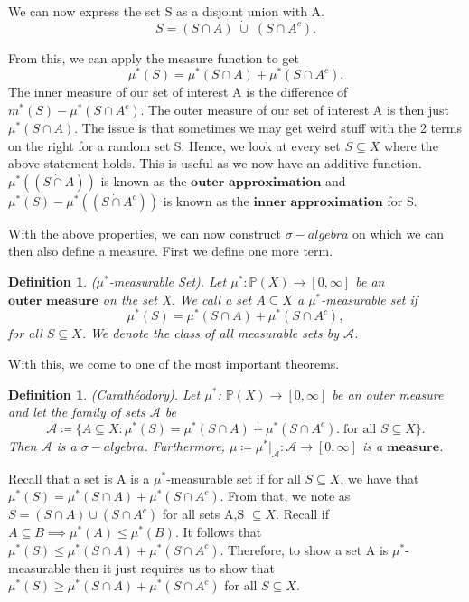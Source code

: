 \documentclass[twoside]{article}
\newtheorem{definition}[theorem]{Definition}
\newcommand{\sa}{\sigma-algebra}
\begin{document}
We can now express the set S as a disjoint union with A. 
$$
S = (S \cap A)\; \dot{\cup} \;(S \cap A^c).
$$

From this, we can apply the measure function to get
$$
\mu^*(S) = \mu^*(S \cap A) + \mu^*(S \cap A^c).
$$
The inner measure of our set of interest A is the difference of $m^*(S) - \mu^*(S \cap A^c)$. The outer measure of our set of interest A is then just $\mu^*(S \cap A)$. The issue is that sometimes we may get weird stuff with the 2 terms on the right for a random set S. Hence, we look at every set $S \subseteq X$ where the above statement holds. This is useful as we now have an additive function. $\mu^*((S \dot{\cap} A))$ is known as the $\textbf{outer approximation}$ and $\mu^*(S)-\mu^*((S \dot{\cap} A^c))$ is known as the $\textbf{inner approximation}$ for S.


With the above properties, we can now construct $\sa$ on which we can then also define a measure. First we define one more term.

\begin{definition}
($\mu^*$-measurable Set). Let $\mu^*: \mathbb{P}(X) \rightarrow [0,\infty]$ be an $\textbf{outer measure}$ on the set X. We call a set $A \subseteq X$ a $\mu^*$-measurable set if
$$
\mu^*(S) = \mu^*(S \cap A) + \mu^*(S \cap A^c),
$$
for all $S \subseteq X$. We denote the class of all measurable sets by $\mathcal{A}$.
\end{definition}

With this, we come to one of the most important theorems.

\begin{definition}
(Carathéodory). Let $\mu^*$: $\mathbb{P}(X) \rightarrow [0, \infty]$ be an outer measure and let the family of sets $\mathcal{A}$ be
$$
\mathcal{A} \coloneqq \{A \subseteq X: \mu^*(S) = \mu^*(S \cap A) + \mu^*(S \cap A^c). \; \text{for all } S \subseteq X\}.
$$ 
Then $\mathcal{A}$ is a $\sa$. Furthermore, $\mu \coloneqq \mu^*|_{\mathcal{A}}: \mathcal{A} \rightarrow [0,\infty]$ is a $\textbf{measure}$.
\end{definition}


Recall that a set is A is a $\mu^*$-measurable set if for all $S \subseteq X$, we have that $\mu^*(S) = \mu^*(S \cap A) + \mu^*(S \cap A^c)$. From that, we note as $S = (S \cap A) \cup (S \cap A^c)$ for all sets A,S $\subseteq X$. Recall if $A \subseteq B \implies \mu^*(A) \leq \mu^*(B)$. It follows that $\mu^*(S) \leq \mu^*(S \cap A) + \mu^*(S \cap A^c)$. Therefore, to show a set A is $\mu^*$-measurable then it just requires us to show that $\mu^*(S) \geq \mu^*(S \cap A) + \mu^*(S \cap A^c)$ for all $S \subseteq X$.
\end{document}
